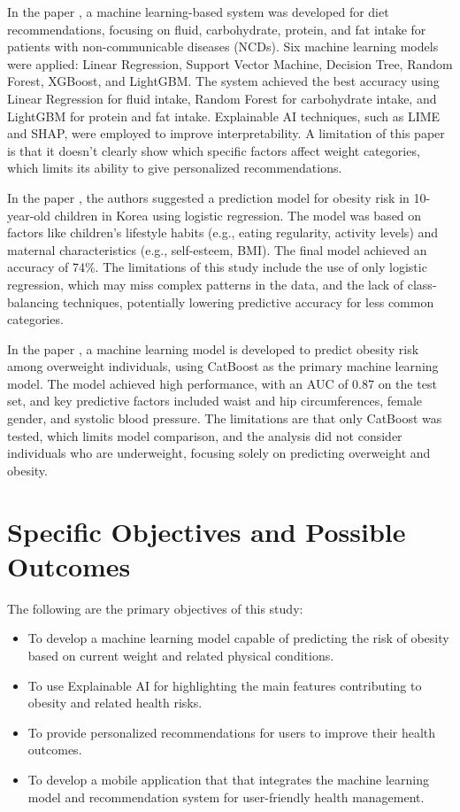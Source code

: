 In the paper \cite{Khan2023}, a machine learning-based system was developed for diet recommendations, focusing on fluid, carbohydrate, protein, and fat intake for patients with non-communicable diseases (NCDs). Six machine learning models were applied: Linear Regression, Support Vector Machine, Decision Tree, Random Forest, XGBoost, and LightGBM. The system achieved the best accuracy using Linear Regression for fluid intake, Random Forest for carbohydrate intake, and LightGBM for protein and fat intake. Explainable AI techniques, such as LIME and SHAP, were employed to improve interpretability. A limitation of this paper is that it doesn’t clearly show which specific factors affect weight categories, which limits its ability to give personalized recommendations. 

In the paper \cite{Nafiseh2023}, the authors suggested a prediction model for obesity risk in 10-year-old children in Korea using logistic regression. The model was based on factors like children's lifestyle habits (e.g., eating regularity, activity levels) and maternal characteristics (e.g., self-esteem, BMI). The final model achieved an accuracy of 74\%. The  limitations of this study include the use of only logistic regression, which may miss complex patterns in the data, and the lack of class-balancing techniques, potentially lowering predictive accuracy for less common categories. 

In the paper \cite{Khalil2023}, a machine learning model is developed to predict obesity risk among overweight individuals, using CatBoost as the primary machine learning model. The model achieved high performance, with an AUC of 0.87 on the test set, and key predictive factors included waist and hip circumferences, female gender, and systolic blood pressure. The limitations are that only CatBoost was tested, which limits model comparison, and the analysis did not consider individuals who are underweight, focusing solely on predicting overweight and obesity. 
\section{Specific Objectives and Possible Outcomes}

The following are the primary objectives of this study: 

\begin{itemize}
    \item To develop a machine learning model capable of predicting the risk of obesity based on current weight and related physical conditions.
    
    \item To use Explainable AI for highlighting the main features contributing to obesity and related health risks.
    
    \item To provide personalized recommendations for users to improve their health outcomes.
    \item  To develop a mobile application that that integrates the machine learning model and recommendation system for user-friendly health management.
\end{itemize}




